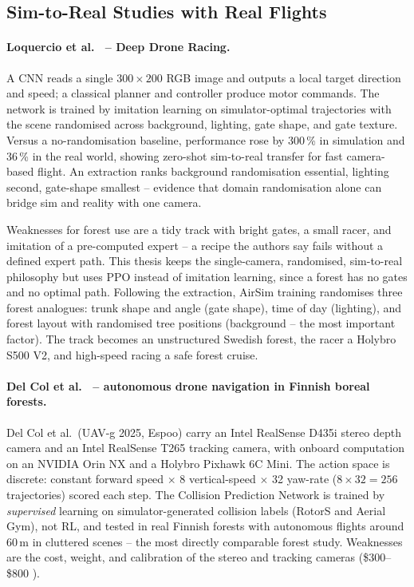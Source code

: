 \documentclass[../main.tex]{subfiles}
\begin{document}
\subsection{Sim-to-Real Studies with Real Flights}

\paragraph{Loquercio et al.\ \cite{Loquercio2019} -- Deep Drone Racing.}
A CNN reads a single $300\times200$ RGB image and outputs a local target direction and speed; a classical planner and controller produce motor commands. The network is trained by imitation learning on simulator-optimal trajectories with the scene randomised across background, lighting, gate shape, and gate texture. Versus a no-randomisation baseline, performance rose by 300\,\% in simulation and 36\,\% in the real world, showing zero-shot sim-to-real transfer for fast camera-based flight. An extraction ranks background randomisation essential, lighting second, gate-shape smallest -- evidence that domain randomisation alone can bridge sim and reality with one camera.

Weaknesses for forest use are a tidy track with bright gates, a small racer, and imitation of a pre-computed expert -- a recipe the authors say fails without a defined expert path. This thesis keeps the single-camera, randomised, sim-to-real philosophy but uses PPO instead of imitation learning, since a forest has no gates and no optimal path. Following the extraction, AirSim training randomises three forest analogues: trunk shape and angle (gate shape), time of day (lighting), and forest layout with randomised tree positions (background -- the most important factor). The track becomes an unstructured Swedish forest, the racer a Holybro S500 V2, and high-speed racing a safe forest cruise.

\paragraph{Del Col et al.\ \cite{DelCol2025} -- autonomous drone navigation in Finnish boreal forests.}
Del Col et al.\ (UAV-g 2025, Espoo) carry an Intel RealSense D435i stereo depth camera and an Intel RealSense T265 tracking camera, with onboard computation on an NVIDIA Orin NX and a Holybro Pixhawk 6C Mini. The action space is discrete: constant forward speed $\times$ 8 vertical-speed $\times$ 32 yaw-rate ($8\times32=256$ trajectories) scored each step. The Collision Prediction Network is trained by \emph{supervised} learning on simulator-generated collision labels (RotorS and Aerial Gym), not RL, and tested in real Finnish forests with autonomous flights around 60\,m in cluttered scenes -- the most directly comparable forest study. Weaknesses are the cost, weight, and calibration of the stereo and tracking cameras (\$300--\$800 \cite{Butt2024,Hrabar2012}).
\end{document}
